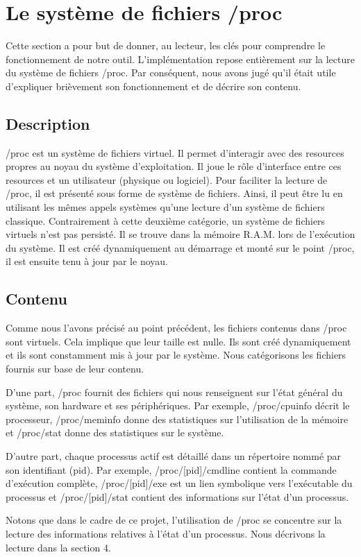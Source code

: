 \section{Le système de fichiers /proc}
Cette section a pour but de donner, au lecteur, les clés pour comprendre le fonctionnement de notre outil. L'implémentation repose entièrement sur la lecture du système de fichiers /proc. Par conséquent, nous avons jugé qu'il était utile d'expliquer brièvement son fonctionnement et de décrire son contenu.

\subsection{Description}
/proc est un système de fichiers virtuel. Il permet d'interagir avec des resources propres au noyau du système d'exploitation. Il joue le rôle d'interface entre ces resources et un utilisateur (physique ou logiciel). Pour faciliter la lecture de /proc, il est présenté sous forme de système de fichiers. Ainsi, il peut être lu en utilisant les mêmes appels systèmes qu'une lecture d'un système de fichiers classique. Contrairement à cette deuxième catégorie, un système de fichiers virtuels n'est pas persisté. Il se trouve dans la mémoire R.A.M. lors de l'exécution du système. Il est créé dynamiquement au démarrage et monté sur le point /proc, il est ensuite tenu à jour par le noyau.

\subsection{Contenu}
Comme nous l'avons précisé au point précédent, les fichiers contenus dans /proc sont virtuels. Cela implique que leur taille est nulle. Ils sont créé dynamiquement et ils sont constamment mis à jour par le système. Nous catégorisons les fichiers fournis sur base de leur contenu.

D'une part, /proc fournit des fichiers qui nous renseignent sur l'état général du système, son hardware et ses périphériques. Par exemple, /proc/cpuinfo décrit le processeur, /proc/meminfo donne des statistiques sur l'utilisation de la mémoire et /proc/stat donne des statistiques sur le système. 

D'autre part, chaque processus actif est détaillé dans un répertoire nommé par son identifiant (pid). Par exemple, /proc/[pid]/cmdline contient la commande d'exécution complète, /proc/[pid]/exe est un lien symbolique vers l'exécutable du processus et /proc/[pid]/stat contient des informations sur l'état d'un processus.

Notons que dans le cadre de ce projet, l'utilisation de /proc se concentre sur la lecture des informations relatives à l'état d'un processus. Nous décrivons la lecture dans la section 4.